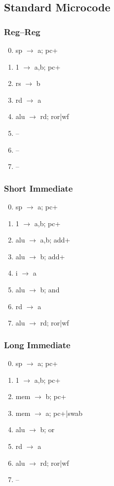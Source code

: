 \documentclass[11pt]{book}
\begin{document}
\subsection*{Standard Microcode}
\begin{multicols}{3}\ttfamily\selectfont\small
  \subsubsection*{Reg--Reg}
  \begin{enumerate}\setcounter{enumi}{-1}
  \item sp \(\rightarrow\) a; pc+
  \item 1 \(\rightarrow\) a,b; pc+
  \item rs \(\rightarrow\) b
  \item rd \(\rightarrow\) a
  \item alu \(\rightarrow\) rd; ror|wf
  \item --
  \item --
  \item --
  \end{enumerate}
  \columnbreak
  \subsubsection*{Short Immediate}
  \begin{enumerate}\setcounter{enumi}{-1}
  \item sp \(\rightarrow\) a; pc+
  \item 1 \(\rightarrow\) a,b; pc+
  \item alu \(\rightarrow\) a,b; add+
  \item alu \(\rightarrow\) b; add+
  \item i \(\rightarrow\) a
  \item alu \(\rightarrow\) b; and
  \item rd \(\rightarrow\) a
  \item alu \(\rightarrow\) rd; ror|wf
  \end{enumerate}
  \columnbreak
  \subsubsection*{Long Immediate}
  \begin{enumerate}\setcounter{enumi}{-1}
  \item sp \(\rightarrow\) a; pc+
  \item 1 \(\rightarrow\) a,b; pc+
  \item mem \(\rightarrow\) b; pc+
  \item mem \(\rightarrow\) a; pc+|swab
  \item alu \(\rightarrow\) b; or
  \item rd \(\rightarrow\) a
  \item alu \(\rightarrow\) rd; ror|wf
  \item --
  \end{enumerate}
\end{multicols}
\end{document}
